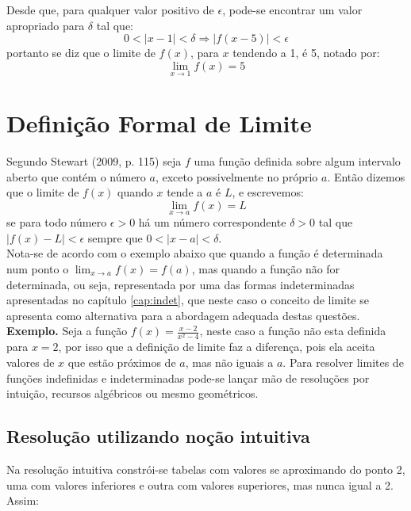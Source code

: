 Desde que, para qualquer valor positivo de $\epsilon$, pode-se encontrar  um valor apropriado para $\delta$ tal que:
$$
0 < \vert x - 1 \vert < \delta \Rightarrow \vert f(x-5) \vert < \epsilon
$$
portanto se diz que  o limite de $f(x)$, para $x$ tendendo a 1, é 5, notado por:
$$
\lim_{x \to 1}  f(x) = 5
$$


\section{Definição Formal de Limite}
\quad Segundo Stewart (2009, p. 115) seja $f$ uma função definida sobre algum intervalo aberto que contém o número $a$, exceto possivelmente no próprio $a$. Então dizemos que o limite de $f(x)$ quando $x$ tende a $a$ é $L$, e escrevemos:
$$
\lim_{x \to a} f(x) = L
$$
se para todo número $\epsilon > 0$ há um número correspondente $\delta > 0$ tal que  $\vert f(x) - L \vert < \epsilon $ sempre que $0 < \vert x- a \vert < \delta$.\\

Nota-se de acordo com o exemplo abaixo que quando a função é determinada num ponto o $\displaystyle \lim_{x \to a} f(x) = f(a)$, mas quando a função não for determinada, ou seja, representada por uma das formas indeterminadas apresentadas no capítulo \ref{cap:indet}, que neste caso o conceito de limite se apresenta como alternativa para a abordagem adequada destas questões.\\

\textbf{Exemplo.} Seja a função $\displaystyle f(x) = \frac{x-2}{x^2-4}$, neste caso a função não esta definida para $x=2$, por isso que a definição de limite faz a diferença, pois ela aceita valores de $x$ que estão próximos de $a$, mas não iguais a $a$. Para resolver limites de funções indefinidas e indeterminadas pode-se lançar mão de resoluções por intuição, recursos algébricos ou mesmo geométricos.

\subsection{Resolução utilizando noção intuitiva}
Na resolução intuitiva constrói-se tabelas com valores se aproximando do ponto 2, uma com valores inferiores e outra com valores superiores, mas nunca igual a 2. Assim:

